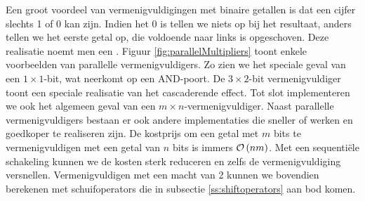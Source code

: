Een groot voordeel van vermenigvuldigingen met binaire getallen is dat een cijfer slechts 1 of 0 kan zijn. Indien het 0 is tellen we niets op bij het resultaat, anders tellen we het eerste getal op, die voldoende naar links is opgeschoven. Deze realisatie noemt men een . Figuur \ref{fig:parallelMultipliers} toont enkele voorbeelden van parallelle vermenigvuldigers. Zo zien we het speciale geval van een $1\times 1$-bit, wat neerkomt op een AND-poort. De $3\times 2$-bit vermenigvuldiger toont een speciale realisatie van het cascaderende effect. Tot slot implementeren we ook het algemeen geval van een $m\times n$-vermenigvuldiger. Naast parallelle vermenigvuldigers bestaan er ook andere implementaties die sneller of werken en goedkoper te realiseren zijn. De kostprijs om een getal met $m$ bits te vermenigvuldigen met een getal van $n$ bits is immers $\mathcal{O}\left(nm\right)$. Met een sequenti\"ele schakeling kunnen we de kosten sterk reduceren en zelfs de vermenigvuldiging versnellen. Vermenigvuldigen met een macht van 2 kunnen we bovendien berekenen met schuifoperators die in subsectie \ref{ss:shiftoperators} aan bod komen.
